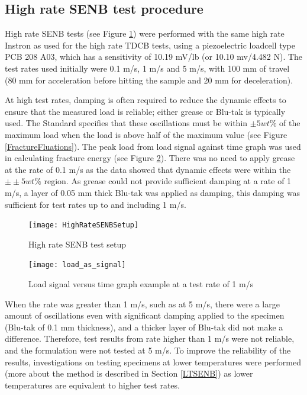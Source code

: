 \documentclass[numbers=noendperiod,chapterprefix=on]{icldt} %
\begin{document}
\subsection{High rate SENB test procedure}

High rate SENB tests (see Figure \ref{HighRateSENBSetup}) were performed with the same high rate Instron as used for the high rate TDCB tests, using a piezoelectric loadcell type PCB 208 A03, which has a sensitivity of 10.19 mV/lb (or 10.10 mv/4.482 N).
The test rates used initially were 0.1 m/s, 1 m/s and 5 m/s, with 100 mm of travel (80 mm for acceleration before hitting the sample and 20 mm for deceleration). 

At high test rates, damping is often required to reduce the dynamic effects to ensure that the measured load is reliable; either grease or Blu-tak is typically used. The Standard specifies that these oscillations must be within $\pm5 wt\%$ of the maximum load when the load is above half of the maximum value (see Figure \ref{FractureFluations}). 
The peak load from load signal against time graph was used in calculating fracture energy (see Figure \ref{load_as_signal}).
There was no need to apply grease at the rate of 0.1 m/s as the data showed that dynamic effects were within the $\pm±5 wt\%$ region. As grease could not provide sufficient damping at a rate of 1 m/s, a layer of 0.05 mm thick Blu-tak was applied as damping, this damping was sufficient for test rates up to and including 1 m/s.

\begin{figure}[!htpb]
\centering
\texttt{[image: HighRateSENBSetup]}
\caption{High rate SENB test setup } \label{HighRateSENBSetup}
\end{figure}
\FloatBarrier

\begin{figure}[!htpb]
\centering
\texttt{[image: load\_as\_signal]}
\caption{Load signal versus time graph example at a test rate of 1 m/s} \label{load_as_signal}
\end{figure}
\FloatBarrier

When the rate was greater than 1 m/s, such as at 5 m/s, there were a large amount of oscillations even with significant damping applied to the specimen (Blu-tak of 0.1 mm thickness), and a thicker layer of Blu-tak did not make a difference. Therefore, test results from rate higher than 1 m/s were not reliable, and the formulation were not tested at 5 m/s. To improve the reliability of the results, investigations on testing specimens at lower temperatures were performed (more about the method is described in Section \ref{LTSENB}) as lower temperatures are equivalent to higher test rates. 
\end{document}
